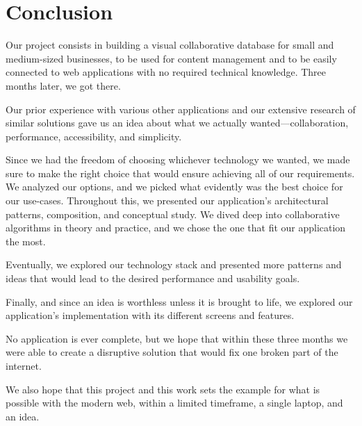 \chapter*{Conclusion}

Our project consists in building a visual collaborative database for small and medium-sized businesses, to be used for content management and to be easily connected to web applications with no required technical knowledge. Three months later, we got there.

Our prior experience with various other applications and our extensive research of similar solutions gave us an idea about what we actually wanted---collaboration, performance, accessibility, and simplicity.

Since we had the freedom of choosing whichever technology we wanted, we made sure to make the right choice that would ensure achieving all of our requirements.
We analyzed our options, and we picked what evidently was the best choice for our use-cases.
Throughout this, we presented our application's architectural patterns, composition, and conceptual study.
We dived deep into collaborative algorithms in theory and practice, and we chose the one that fit our application the most.

Eventually, we explored our technology stack and presented more patterns and ideas that would lead to the desired performance and usability goals.

Finally, and since an idea is worthless unless it is brought to life, we explored our application's implementation with its different screens and features.

No application is ever complete, but we hope that within these three months we were able to create a disruptive solution that would fix one broken part of the internet.

We also hope that this project and this work sets the example for what is possible with the modern web, within a limited timeframe, a single laptop, and an idea.